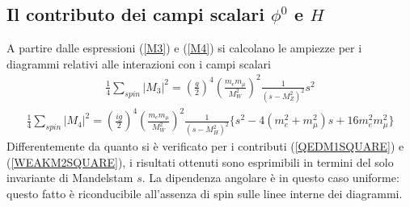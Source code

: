 \documentclass[11pt]{article}
\begin{document}
    \subsection*{Il contributo dei campi scalari $\phi^0$ e $H$}
    A partire dalle espressioni (\ref{M3}) e (\ref{M4}) si calcolano le ampiezze per i diagrammi relativi alle interazioni con i campi scalari
    \begin{equation}
    \begin{split}
    \frac{1}{4}\sum_{spin}\lvert M_3\rvert^2=\left(\frac{g}{2}\right)^4\left(\frac{m_em_\mu}{M_W^2}\right)^2\frac{1}{(s-M_Z^2)^2}s^2
    \end{split}
    \end{equation}
    \begin{equation}
    \begin{split}
    \frac{1}{4}\sum_{spin}\lvert M_4\rvert^2=\left(\frac{ig}{2}\right)^4\left(\frac{m_em_\mu}{M_W^2}\right)^2\frac{1}{(s-M_H^2)^2}\{s^2-4(m_e^2+m_\mu^2)s+16m_e^2m_\mu^2\}
    \end{split}
    \end{equation}
    Differentemente da quanto si è verificato per i contributi (\ref{QEDM1SQUARE}) e (\ref{WEAKM2SQUARE}), i risultati ottenuti sono esprimibili in termini del solo invariante di Mandelstam $s$.
    La dipendenza angolare è in questo caso uniforme: questo fatto è riconducibile all'assenza di spin sulle linee interne dei diagrammi.
\end{document}
